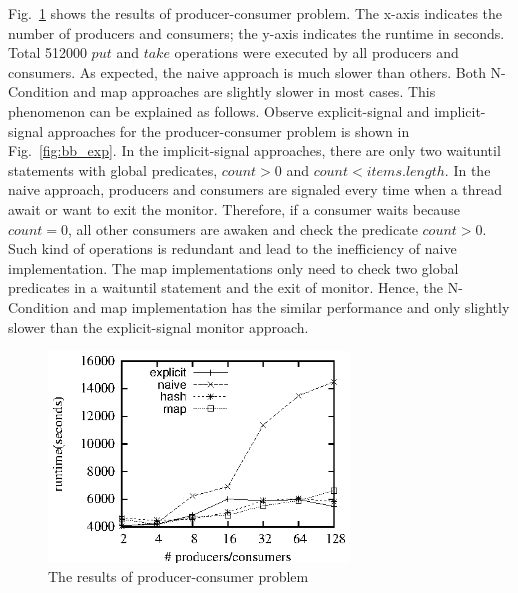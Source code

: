 \documentclass[preprint]{sigplanconf}
\begin{document}
Fig.~\ref{fig:pc_eval} shows the results of producer-consumer problem. The
x-axis indicates the number of producers and consumers; the y-axis indicates the
runtime in seconds. Total 512000 $put$ and $take$ operations were executed by
all producers and consumers. As expected, the naive approach is much slower than
others. Both N-Condition and map approaches are slightly slower in most cases.
This phenomenon can be explained as follows. Observe explicit-signal and 
implicit-signal approaches for the producer-consumer problem is shown in 
Fig.~\ref{fig:bb_exp}. In the implicit-signal approaches, there are only two 
waituntil statements with global predicates, $count > 0$ and 
$count < items.length$. In the naive approach, producers and consumers are
signaled every time when a thread await or want to exit the monitor. Therefore,
if a consumer waits because $count = 0$, all other consumers are awaken and
check the predicate $count > 0$. Such kind of operations is redundant and lead
to the inefficiency of naive implementation. The map
implementations only need to check two global predicates in a waituntil
statement and the exit of monitor. Hence, the N-Condition and map implementation 
has the similar performance and only slightly slower than the explicit-signal
monitor approach. 
\begin{figure}[ht!]
  \centering
  \includegraphics[width=80mm]{fig/pc.eps}
  \caption{The results of producer-consumer problem}
  \label{fig:pc_eval}
\end{figure}
\end{document}
